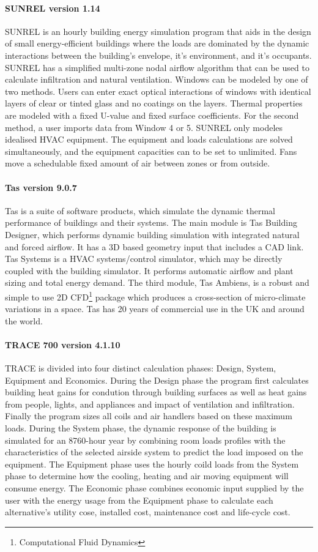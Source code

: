 \paragraph{SUNREL version 1.14} SUNREL is an hourly building energy simulation program that aids in the design of small energy-efficient buildings where the loads are dominated by the dynamic interactions between the building's envelope, it's environment, and it's occupants. SUNREL has a simplified multi-zone nodal airflow algorithm that can be used to calculate infiltration and natural ventilation. Windows can be modeled by one of two methods. Users can enter exact optical interactions of windows with identical layers of clear or tinted glass and no coatings on the layers. Thermal properties are modeled with a fixed U-value and fixed surface coefficients. For the second method, a user imports data from Window 4 or 5. SUNREL only modeles idealised HVAC equipment. The equipment and loads calculations are solved simultaneously, and the equipment capacities can to be set to unlimited. Fans move a schedulable fixed amount of air between zones or from outside.

\paragraph{Tas version 9.0.7} Tas is a suite of software products, which simulate the dynamic thermal performance of buildings and their systems. The main module is Tas Building Designer, which performs dynamic building simulation with integrated natural and forced airflow. It has a 3D based geometry input that includes a CAD link. Tas Systems is a HVAC systems/control simulator, which may be directly coupled with the building simulator. It performs automatic airflow and plant sizing and total energy demand. The third module, Tas Ambiens, is a robust and simple to use 2D CFD\footnote{Computational Fluid Dynamics} package which produces a cross-section of micro-climate variations in a space. Tas has 20 years of commercial use in the UK and around the world.

\paragraph{TRACE 700 version 4.1.10} TRACE is divided into four distinct calculation phases: Design, System, Equipment and Economics. During the Design phase the program first calculates building heat gains for condution through building surfaces as well as heat gains from people, lights, and appliances and impact of ventilation and infiltration. Finally the program sizes all coils and air handlers based on these maximum loads. During the System phase, the dynamic response of the building is simulated for an 8760-hour year by combining room loads profiles with the characteristics of the selected airside system to predict the load imposed on the equipment. The Equipment phase uses the hourly coild loads from the System phase to determine how the cooling, heating and air moving equipment will consume energy. The Economic phase combines economic input supplied by the user with the energy usage from the Equipment phase to calculate each alternative's utility cose, installed cost, maintenance cost and life-cycle cost.


